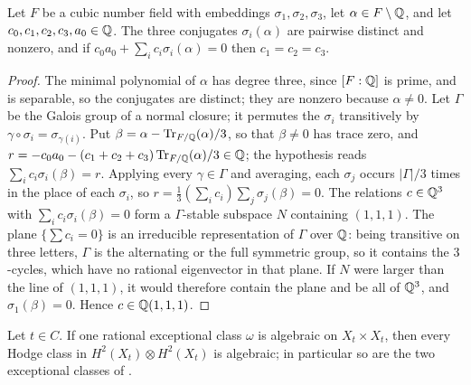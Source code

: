 \begin{lemma}\label{lem:conjugates}
Let $F$ be a cubic number field with embeddings $\sigma_{1},\sigma_{2},
\sigma_{3}$, let $\alpha\in F\setminus\mathbb{Q}$, and let
$c_{0},c_{1},c_{2},c_{3},a_{0}\in\mathbb{Q}$. The three conjugates
$\sigma_{i}(\alpha)$ are pairwise distinct and nonzero, and if
$c_{0}a_{0}+\sum_{i}c_{i}\sigma_{i}(\alpha)=0$ then $c_{1}=c_{2}=c_{3}$.
\end{lemma}

\begin{proof}
The minimal polynomial of $\alpha$ has degree three, since $[F:\mathbb{Q}]$ is prime,
and is separable, so the conjugates are distinct; they are nonzero because
$\alpha\ne0$. Let $\Gamma$ be the Galois group of a normal closure; it
permutes the $\sigma_{i}$ transitively by $\gamma\circ\sigma_{i}=
\sigma_{\gamma(i)}$. Put $\beta=\alpha-\operatorname{Tr}_{F/\mathbb{Q}}(\alpha)/3$, so that
$\beta\ne0$ has trace zero, and $r=-c_{0}a_{0}-(c_{1}+c_{2}+c_{3})
\operatorname{Tr}_{F/\mathbb{Q}}(\alpha)/3\in\mathbb{Q}$; the hypothesis reads $\sum_{i}c_{i}\sigma_{i}
(\beta)=r$. Applying every $\gamma\in\Gamma$ and averaging, each $\sigma_{j}$
occurs $|\Gamma|/3$ times in the place of each $\sigma_{i}$, so
$r=\frac13(\sum_{i}c_{i})\sum_{j}\sigma_{j}(\beta)=0$. The relations
$c\in\mathbb{Q}^{3}$ with $\sum_{i}c_{i}\sigma_{i}(\beta)=0$ form a $\Gamma$-stable
subspace $N$ containing $(1,1,1)$. The plane $\{\sum c_{i}=0\}$ is an
irreducible representation of $\Gamma$ over $\mathbb{Q}$: being transitive on three
letters, $\Gamma$ is the alternating or the full symmetric group, so it
contains the $3$-cycles, which have no rational eigenvector in that plane.
If $N$ were larger than the line of $(1,1,1)$, it would therefore contain the
plane and be all of $\mathbb{Q}^{3}$, and $\sigma_{1}(\beta)=0$. Hence
$c\in\mathbb{Q}(1,1,1)$.
\end{proof}

\begin{lemma}\label{lem:oneexceptional}
Let $t\in C$. If one rational exceptional class $\omega$ is algebraic on
$X_{t}\times X_{t}$, then every Hodge class in $H^{2}(X_{t})\otimes
H^{2}(X_{t})$ is algebraic; in particular so are the two exceptional classes
of .
\end{lemma}

